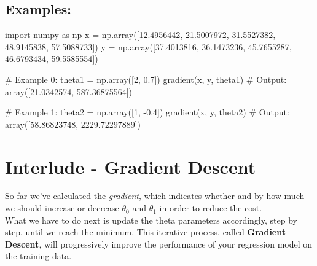 \documentclass[]{article}
\newenvironment{Shaded}{\begin{snugshade}}{\end{snugshade}}
\newcommand{\CommentTok}[1]{\textcolor[rgb]{0.48,0.49,0.49}{#1}}
\newcommand{\DecValTok}[1]{\textcolor[rgb]{0.96,0.45,0.00}{#1}}
\newcommand{\FloatTok}[1]{\textcolor[rgb]{0.96,0.45,0.00}{#1}}
\newcommand{\ImportTok}[1]{\textcolor[rgb]{0.15,0.68,0.38}{#1}}
\newcommand{\NormalTok}[1]{\textcolor[rgb]{0.81,0.81,0.76}{#1}}
\newcommand{\OperatorTok}[1]{\textcolor[rgb]{0.81,0.81,0.76}{#1}}
\begin{document}
\hypertarget{examples-3}{%
\subsection{Examples:}\label{examples-3}}

\begin{Shaded}
\begin{Highlighting}[]
\ImportTok{import}\NormalTok{ numpy }\ImportTok{as}\NormalTok{ np}
\NormalTok{x }\OperatorTok{=}\NormalTok{ np.array([}\FloatTok{12.4956442}\NormalTok{, }\FloatTok{21.5007972}\NormalTok{, }\FloatTok{31.5527382}\NormalTok{, }\FloatTok{48.9145838}\NormalTok{, }\FloatTok{57.5088733}\NormalTok{])}
\NormalTok{y }\OperatorTok{=}\NormalTok{ np.array([}\FloatTok{37.4013816}\NormalTok{, }\FloatTok{36.1473236}\NormalTok{, }\FloatTok{45.7655287}\NormalTok{, }\FloatTok{46.6793434}\NormalTok{, }\FloatTok{59.5585554}\NormalTok{])}

\CommentTok{# Example 0:}
\NormalTok{theta1 }\OperatorTok{=}\NormalTok{ np.array([}\DecValTok{2}\NormalTok{, }\FloatTok{0.7}\NormalTok{])}
\NormalTok{gradient(x, y, theta1)}
\CommentTok{# Output:}
\NormalTok{array([}\FloatTok{21.0342574}\NormalTok{, }\FloatTok{587.36875564}\NormalTok{])}

\CommentTok{# Example 1:}
\NormalTok{theta2 }\OperatorTok{=}\NormalTok{ np.array([}\DecValTok{1}\NormalTok{, }\FloatTok{-0.4}\NormalTok{])}
\NormalTok{gradient(x, y, theta2)}
\CommentTok{# Output:}
\NormalTok{array([}\FloatTok{58.86823748}\NormalTok{, }\FloatTok{2229.72297889}\NormalTok{])}
\end{Highlighting}
\end{Shaded}

\clearpage

\hypertarget{interlude---gradient-descent-1}{%
\section{Interlude - Gradient
Descent}\label{interlude---gradient-descent-1}}

So far we've calculated the \emph{gradient}, which indicates whether and
by how much we should increase or decrease \(\theta_0\) and \(\theta_1\)
in order to reduce the cost.\\
What we have to do next is update the theta parameters accordingly, step
by step, until we reach the minimum. This iterative process, called
\textbf{Gradient Descent}, will progressively improve the performance of
your regression model on the training data.
\end{document}
